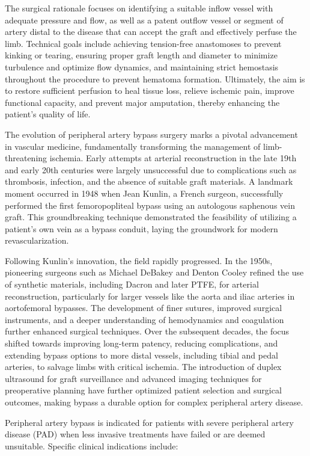 The surgical rationale focuses on identifying a suitable inflow vessel with adequate pressure and flow, as well as a patent outflow vessel or segment of artery distal to the disease that can accept the graft and effectively perfuse the limb. Technical goals include achieving tension-free anastomoses to prevent kinking or tearing, ensuring proper graft length and diameter to minimize turbulence and optimize flow dynamics, and maintaining strict hemostasis throughout the procedure to prevent hematoma formation. Ultimately, the aim is to restore sufficient perfusion to heal tissue loss, relieve ischemic pain, improve functional capacity, and prevent major amputation, thereby enhancing the patient's quality of life.

The evolution of peripheral artery bypass surgery marks a pivotal advancement in vascular medicine, fundamentally transforming the management of limb-threatening ischemia. Early attempts at arterial reconstruction in the late 19th and early 20th centuries were largely unsuccessful due to complications such as thrombosis, infection, and the absence of suitable graft materials. A landmark moment occurred in 1948 when Jean Kunlin, a French surgeon, successfully performed the first femoropopliteal bypass using an autologous saphenous vein graft. This groundbreaking technique demonstrated the feasibility of utilizing a patient's own vein as a bypass conduit, laying the groundwork for modern revascularization.

Following Kunlin's innovation, the field rapidly progressed. In the 1950s, pioneering surgeons such as Michael DeBakey and Denton Cooley refined the use of synthetic materials, including Dacron and later PTFE, for arterial reconstruction, particularly for larger vessels like the aorta and iliac arteries in aortofemoral bypasses. The development of finer sutures, improved surgical instruments, and a deeper understanding of hemodynamics and coagulation further enhanced surgical techniques. Over the subsequent decades, the focus shifted towards improving long-term patency, reducing complications, and extending bypass options to more distal vessels, including tibial and pedal arteries, to salvage limbs with critical ischemia. The introduction of duplex ultrasound for graft surveillance and advanced imaging techniques for preoperative planning have further optimized patient selection and surgical outcomes, making bypass a durable option for complex peripheral artery disease.

Peripheral artery bypass is indicated for patients with severe peripheral artery disease (PAD) when less invasive treatments have failed or are deemed unsuitable. Specific clinical indications include:

